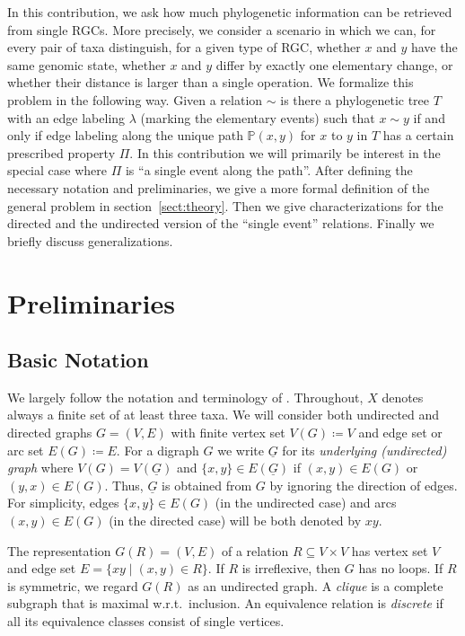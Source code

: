 \documentclass[smallextended]{svjour3}
\let\cite\citep
\begin{document}
In this contribution, we ask how much phylogenetic information can be
retrieved from single RGCs. More precisely, we consider a scenario in which
we can, for every pair of taxa distinguish, for a given type of RGC,
whether $x$ and $y$ have the same genomic state, whether $x$ and $y$ differ
by exactly one elementary change, or whether their distance is larger than
a single operation. We formalize this problem in the following way. Given a
relation $\sim$ is there a phylogenetic tree $T$ with an edge labeling
$\lambda$ (marking the elementary events) such that $x\sim y$ if and only
if edge labeling along the unique path $\mathbb{P}(x,y)$ for $x$ to $y$ in
$T$ has a certain prescribed property $\Pi$. In this contribution we will
primarily be interest in the special case where $\Pi$ is ``a single event
along the path''. After defining the necessary notation and preliminaries,
we give a more formal definition of the general problem in
section~\ref{sect:theory}. Then we give characterizations for the directed
and the undirected version of the ``single event'' relations. Finally we
briefly discuss generalizations.

\section{Preliminaries}
\label{sec:prelim}

\subsection{Basic Notation} 

We largely follow the notation and terminology of
\cite{sem-ste-03a}. Throughout, $X$ denotes always a finite set of at least
three taxa. We will consider both undirected and directed graphs $G=(V,E)$
with finite vertex set $V(G)\coloneqq V$ and edge set or arc set
$E(G)\coloneqq E$.  For a digraph $G$ we write $\underline{G}$ for its
\emph{underlying (undirected) graph} where $V(G)=V(\underline{G})$ and
$\{x,y\}\in E(\underline{G})$ if $(x,y)\in E(G)$ or $(y,x)\in E(G)$. Thus,
$\underline{G}$ is obtained from $G$ by ignoring the direction of edges.
For simplicity, edges $\{x,y\}\in E(G)$ (in the undirected case) and arcs
$(x,y)\in E(G)$ (in the directed case) will be both denoted by $xy$.

The representation $G(R)=(V,E)$ of a relation $R\subseteq V\times V$ has
vertex set $V$ and edge set $E=\{xy\mid (x,y)\in R\}$. If $R$ is
irreflexive, then $G$ has no loops. If $R$ is symmetric, we regard $G(R)$
as an undirected graph. A \emph{clique} is a complete subgraph that is
maximal w.r.t.\ inclusion. An equivalence relation is \emph{discrete} if
all its equivalence classes consist of single vertices.
\end{document}
